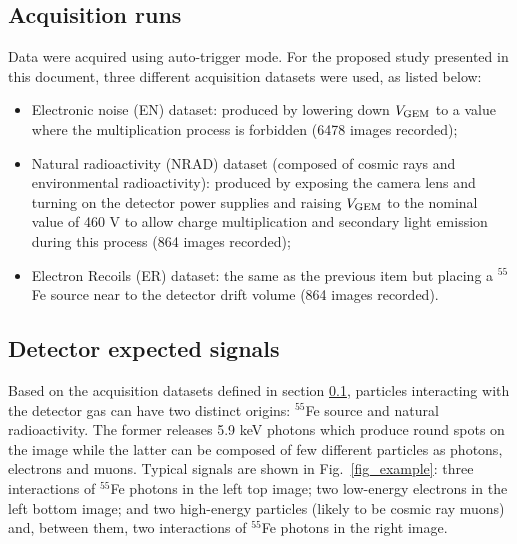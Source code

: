 \documentclass[a4paper,11pt]{article}
\begin{document}


\subsection{Acquisition runs}
\label{sec:acrRuns}

Data were acquired using auto-trigger mode. For the proposed study presented in this document, three different acquisition datasets were used, as listed below:

\begin{itemize}
    \item Electronic noise (EN) dataset: produced by lowering down $V\rm _{GEM}$ to a value where the multiplication process is forbidden (6478 images recorded);
    \item Natural radioactivity (NRAD) dataset (composed of cosmic rays and environmental radioactivity): produced by exposing the camera lens and turning on the detector power supplies and raising $V\rm _{GEM}$ to the nominal value of 460 V to allow charge multiplication and secondary light emission during this process (864 images recorded);
    \item Electron Recoils (ER) dataset: the same as the previous item but placing a $^{55}$Fe source near to the detector drift volume (864 images recorded).
\end{itemize}


\subsection{Detector expected signals}

Based on the acquisition datasets defined in section \ref{sec:acrRuns}, particles interacting with the detector gas can have two distinct origins: $^{55}$Fe source and natural radioactivity. The former releases 5.9 keV photons which produce round spots on the image while the latter can be composed of few different particles as photons, electrons and muons. 
Typical signals are shown in  Fig.~\ref{fig_example}:
three interactions of $^{55}$Fe photons in the left top image; two low-energy electrons in the left bottom image; and two high-energy particles (likely to be cosmic ray muons) and, between them, two interactions of $^{55}$Fe photons in the right image.
\end{document}
